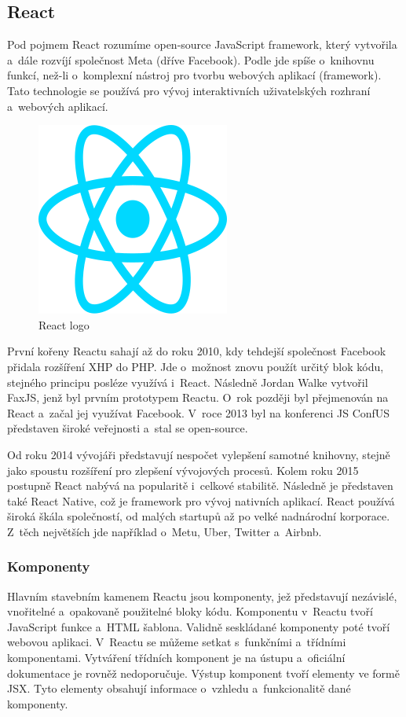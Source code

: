 \subsection{React}

Pod pojmem React rozumíme open-source JavaScript framework, který vytvořila a~dále rozvíjí společnost Meta (dříve Facebook). 
Podle \cite{reactbanks} jde spíše o~knihovnu funkcí, než-li o~komplexní nástroj pro tvorbu webových aplikací (framework). 
Tato technologie se používá pro vývoj interaktivních uživatelských rozhraní a~webových aplikací.\cite{reacthubspot}

\begin{figure}[htb]
	\centering
		\includegraphics[width=.25\textwidth]{images/react-logo.png}
	\caption[React logo]{React logo \cite{react}}
	\label{fig:reactlogo}
\end{figure}

První kořeny Reactu sahají až do roku 2010, kdy tehdejší společnost Facebook přidala rozšíření XHP do PHP. 
Jde o~možnost znovu použít určitý blok kódu, stejného principu posléze využívá i~React. Následně Jordan Walke vytvořil FaxJS, jenž byl prvním prototypem Reactu.
O~rok později byl přejmenován na React a~začal jej využívat Facebook. 
V~roce 2013 byl na konferenci JS ConfUS představen široké veřejnosti a~stal se open-source.

Od roku 2014 vývojáři představují nespočet vylepšení samotné knihovny, stejně jako spoustu rozšíření pro zlepšení vývojových procesů. 
Kolem roku 2015 postupně React nabývá na popularitě i~celkové stabilitě. Následně je představen také React Native, což je framework pro vývoj nativních aplikací.
React používá široká škála společností, od malých startupů až po velké nadnárodní korporace. 
Z~těch největších jde například o~Metu, Uber, Twitter a~Airbnb.\cite{reactbanks,reactrisingstack}

\subsubsection{Komponenty}

Hlavním stavebním kamenem Reactu jsou komponenty, jež představují nezávislé, vnořitelné a~opakovaně použitelné bloky kódu. 
Komponentu v~Reactu tvoří JavaScript funkce a~HTML šablona. Validně seskládané komponenty poté tvoří webovou aplikaci.
V~Reactu se můžeme setkat s~funkčními a~třídními komponentami. Vytváření třídních komponent je na ústupu a~oficiální dokumentace je rovněž nedoporučuje. 
Výstup komponent tvoří elementy ve formě JSX. Tyto elementy obsahují informace o~vzhledu a~funkcionalitě dané komponenty.

